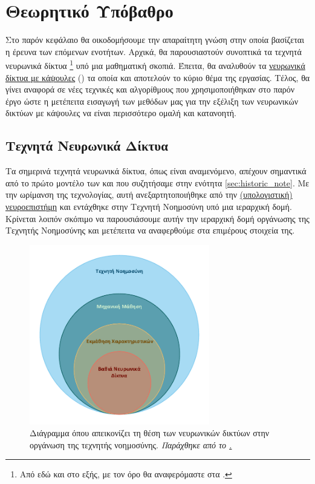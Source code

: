 \chapter{Θεωρητικό Υπόβαθρο}

Στο παρόν κεφάλαιο θα οικοδομήσουμε την απαραίτητη γνώση στην οποία βασίζεται η έρευνα των επόμενων ενοτήτων. Αρχικά, θα παρουσιαστούν συνοπτικά τα τεχνητά νευρωνικά δίκτυα \footnote{Από εδώ και στο εξής, με τον όρο  θα αναφερόμαστε στα .} υπό μια μαθηματική σκοπιά. Έπειτα, θα αναλυθούν τα \hyperlink{_capsule_networks}{νευρωνικά δίκτυα με κάψουλες} (\hyperlink{_capsule_networks}{}) τα οποία και αποτελούν το κύριο θέμα της εργασίας. Τέλος, θα γίνει αναφορά σε νέες τεχνικές και αλγορίθμους που χρησιμοποιήθηκαν στο παρόν έργο ώστε η μετέπειτα εισαγωγή των μεθόδων μας για την εξέλιξη των νευρωνικών δικτύων με κάψουλες να είναι περισσότερο ομαλή και κατανοητή.

\section{Τεχνητά Νευρωνικά Δίκτυα}
Τα σημερινά τεχνητά νευρωνικά δίκτυα, όπως είναι αναμενόμενο, απέχουν σημαντικά από το πρώτο μοντέλο των  και  \cite{mcculloch1943logical} που συζητήσαμε στην ενότητα \ref{sec:historic_note}. Με την ωρίμανση της τεχνολογίας, αυτή ανεξαρτητοποιήθηκε από την \hyperlink{_computational_neuroscience}{(υπολογιστική) νευροεπιστήμη} και εντάχθηκε στην Τεχνητή Νοημοσύνη υπό μια ιεραρχική δομή. Κρίνεται λοιπόν σκόπιμο να παρουσιάσουμε αυτήν την ιεραρχική δομή οργάνωσης της Τεχνητής Νοημοσύνης και μετέπειτα να αναφερθούμε στα επιμέρους στοιχεία της.
\par

\begin{figure}[h]
    \centering
    \includegraphics[width=0.7\textwidth]{images/chapter theoritical background/venn ai diagram thesis in greek new 2.pdf}
    \caption{Διάγραμμα  όπου απεικονίζει τη θέση των νευρωνικών δικτύων στην οργάνωση της τεχνητής νοημοσύνης. \textit{Παράχθηκε από το \href{https://www.microsoft.com/en-gb/microsoft-365/visio/flowchart-software/}{.}} }
    \label{fig:_venn_ai}
\end{figure}

